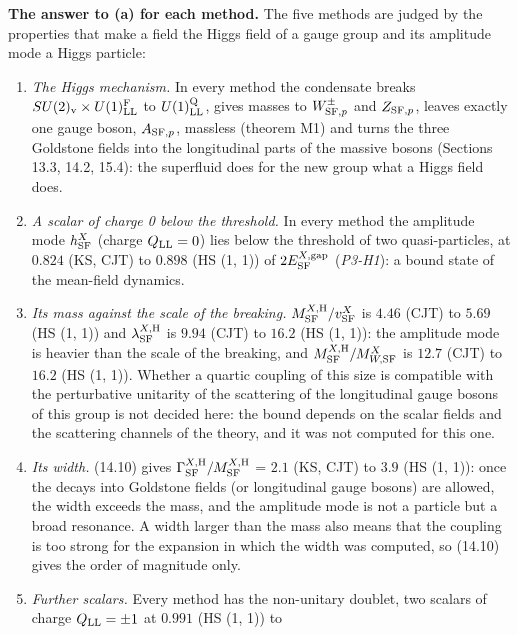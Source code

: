 \documentclass[
  10pt,
]{article}
\providecommand{\tightlist}{%
  \setlength{\itemsep}{0pt}\setlength{\parskip}{0pt}}
\begin{document}
\textbf{The answer to (a) for each method.} The five methods are judged
by the properties that make a field the Higgs field of a gauge group and
its amplitude mode a Higgs particle:

\begin{enumerate}
\def\labelenumi{\arabic{enumi}.}
\tightlist
\item
  \emph{The Higgs mechanism.} In every method the condensate breaks
  \(SU(2)_{\rm v}\times U(1)^{\rm F}_{\rm LL}\) to
  \(U(1)^{\rm Q}_{\rm LL}\), gives masses to \(W^\pm_{{\rm SF},p}\) and
  \(Z_{{\rm SF},p}\), leaves exactly one gauge boson,
  \(A_{{\rm SF},p}\), massless (theorem M1) and turns the three
  Goldstone fields into the longitudinal parts of the massive bosons
  (Sections 13.3, 14.2, 15.4): the superfluid does for the new group
  what a Higgs field does.
\item
  \emph{A scalar of charge 0 below the threshold.} In every method the
  amplitude mode \(h^X_{\rm SF}\) (charge \(Q_{\rm LL}=0\)) lies below
  the threshold of two quasi-particles, at \(0.824\) (KS, CJT) to
  \(0.898\) (HS (1, 1)) of \(2E^{X,{\rm gap}}_{\rm SF}\) (\emph{P3-H1}):
  a bound state of the mean-field dynamics.
\item
  \emph{Its mass against the scale of the breaking.}
  \(M^{X,{\rm H}}_{\rm SF}/v^X_{\rm SF}\) is \(4.46\) (CJT) to \(5.69\)
  (HS (1, 1)) and \(\lambda^{X,{\rm H}}_{\rm SF}\) is \(9.94\) (CJT) to
  \(16.2\) (HS (1, 1)): the amplitude mode is heavier than the scale of
  the breaking, and \(M^{X,{\rm H}}_{\rm SF}/M^X_{W,{\rm SF}}\) is
  \(12.7\) (CJT) to \(16.2\) (HS (1, 1)). Whether a quartic coupling of
  this size is compatible with the perturbative unitarity of the
  scattering of the longitudinal gauge bosons of this group is not
  decided here: the bound depends on the scalar fields and the
  scattering channels of the theory, and it was not computed for this
  one.
\item
  \emph{Its width.} (14.10) gives
  \(\Gamma^{X,{\rm H}}_{\rm SF}/M^{X,{\rm H}}_{\rm SF}\) = \(2.1\) (KS,
  CJT) to \(3.9\) (HS (1, 1)): once the decays into Goldstone fields (or
  longitudinal gauge bosons) are allowed, the width exceeds the mass,
  and the amplitude mode is not a particle but a broad resonance. A
  width larger than the mass also means that the coupling is too strong
  for the expansion in which the width was computed, so (14.10) gives
  the order of magnitude only.
\item
  \emph{Further scalars.} Every method has the non-unitary doublet, two
  scalars of charge \(Q_{\rm LL}=\pm1\) at \(0.991\) (HS (1, 1)) to

\end{enumerate}
\end{document}
